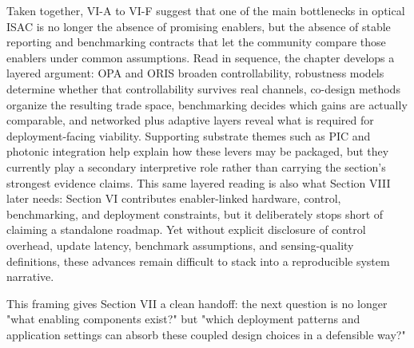 Taken together, VI-A to VI-F suggest that one of the main bottlenecks in optical ISAC is no longer the absence of promising enablers, but the absence of stable reporting and benchmarking contracts that let the community compare those enablers under common assumptions. Read in sequence, the chapter develops a layered argument: OPA and ORIS broaden controllability, robustness models determine whether that controllability survives real channels, co-design methods organize the resulting trade space, benchmarking decides which gains are actually comparable, and networked plus adaptive layers reveal what is required for deployment-facing viability. Supporting substrate themes such as PIC and photonic integration help explain how these levers may be packaged, but they currently play a secondary interpretive role rather than carrying the section's strongest evidence claims. This same layered reading is also what Section VIII later needs: Section VI contributes enabler-linked hardware, control, benchmarking, and deployment constraints, but it deliberately stops short of claiming a standalone roadmap. Yet without explicit disclosure of control overhead, update latency, benchmark assumptions, and sensing-quality definitions, these advances remain difficult to stack into a reproducible system narrative.

This framing gives Section VII a clean handoff: the next question is no longer "what enabling components exist?" but "which deployment patterns and application settings can absorb these coupled design choices in a defensible way?"
